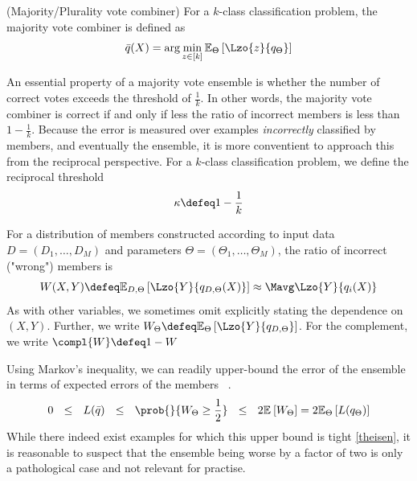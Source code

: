 \documentclass[../main.tex]{subfiles}
\begin{document}
\begin{definition} 
   \label{def:majority-vote} 
    (Majority/Plurality vote combiner) For a $k$-class classification problem, the majority vote combiner is defined as
$$
\bar{q}(X) = \arg\min_{z \in [k]} \mathbb{E}_{\Theta}\left[ \Lzo{z}{q_{\Theta}} \right]  
$$
\end{definition}

An essential property of a majority vote ensemble is whether the number of correct votes exceeds the threshold of $\frac{1}{k}$. In other words, the majority vote combiner is correct if and only if less the ratio of incorrect members is less than $1 - \frac{1}{k}$. Because the error is measured over examples \textit{incorrectly} classified by members, and eventually the ensemble, it is more conventient to approach this from the reciprocal perspective. 
For a $k$-class classification problem, we define the reciprocal threshold
$$
\kappa \defeq 1 - \frac{1}{k}
$$

\begin{definition}
For a distribution of members constructed according to input data $D = (D_{1}, \dots, D_{M})$ and parameters $\Theta = (\Theta_{1}, \dots, \Theta_{M})$, the ratio of incorrect ("wrong") members is
$$
W(X,Y) \defeq \mathbb{E}_{D, \Theta}\left[ \Lzo{Y}{q_{D, \Theta}(X)} \right] \approx \Mavg \Lzo{Y}{q_{i}(X)}
$$
As with other variables, we sometimes omit explicitly stating the dependence on $(X,Y)$. Further, we write $W_{\Theta} \defeq \mathbb{E}_{\Theta}\left[ \Lzo{Y}{q_{D, \Theta}} \right]$. For the complement, we write $\compl{W} \defeq 1 - W$
\end{definition}


Using Markov's inequality, we can readily upper-bound the error of the ensemble in terms of expected errors of the members~\cite{theisen}
.
$$
0 ~ ~ \leq ~ ~ L(\bar{q}) ~ ~ \leq ~ ~ \prob{}{W_{\Theta}  \geq \frac{1}{2}} ~ ~\leq ~ ~ 2 \mathbb{E}_{}\left[ W_{\Theta} \right] = 2 \mathbb{E}_{\Theta}\left[ L(q_{\Theta}) \right] 
$$
While there indeed exist examples for which this upper bound is tight \ref{theisen}, it is reasonable to suspect that the ensemble being worse by a factor of two is only a pathological case and not relevant for practise.
\end{document}
